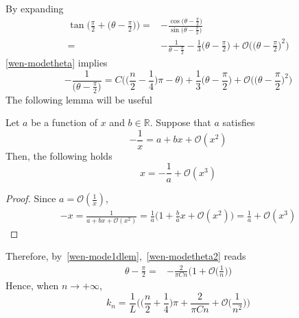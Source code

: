 By expanding
\begin{equation*}
\begin{split}
\tan\Big(\frac{\pi}{2} + \big(\theta - \frac \pi 2 \big) \Big) = &
- \frac{\cos\big(\theta-\frac{\pi}{2}\big)}{\sin\big(\theta-\frac{\pi}{2}\big)} \\
= & 
-\frac{1}{\theta - \frac \pi 2 } - \frac{1}{3}\big(\theta - \frac{\pi}{2}\big) + \mathcal{O}\Big(\big(\theta - \frac \pi 2 \big)^2\Big)
\end{split}
\end{equation*}
\cref{wen-modetheta} implies
\begin{equation}\label{wen-modetheta2}
-\frac{1}{\big(\theta - \frac \pi 2\big)} = 
C\Big( \big(\frac n 2 -\frac 1 4 \big)\pi - \theta \Big) +  \frac{1}{3}\big(\theta - \frac{\pi}{2}\big) + \mathcal{O}\Big(\big(\theta - \frac \pi 2 \big)^2\Big)
\end{equation}
The following lemma will be useful
\begin{lemma}\label{wen-mode1dlem}
Let $a$ be a function of $x$ and $b \in\mathbb{R}$.
Suppose that $a $ satisfies
\begin{equation*}
-\frac 1 x = a + bx + \mathcal{O}(x^2)
\end{equation*}
Then, the following holds
\begin{equation*}
x = -\frac 1 a + \mathcal{O}(x^3)
\end{equation*}
\end{lemma}
\begin{proof}
Since $a = \mathcal{O}(\frac 1 x) $, 
\begin{equation*}
\begin{split}
-x =  \frac{1}{a + bx + \mathcal{O}(x^2)} 
= \frac 1 a \big(1 + \frac b a x + \mathcal{O}(x^2)\big) 
=  \frac 1 a +  \mathcal{O}(x^3)
\end{split}
\end{equation*}
\end{proof}
Therefore, by~\cref{wen-mode1dlem},~\cref{wen-modetheta2} reads
\begin{equation*}
\begin{split}
\theta - \frac{\pi}{ 2} = &  -\frac{2}{\pi C n}\Big( 1 + \mathcal{O}\big( \frac 1 n\big) \Big)
\end{split}
\end{equation*}
Hence, when $n\rightarrow +\infty$, 
\begin{equation*}
k_n = \frac 1 L \Big( \big( \frac n 2 + \frac 1 4 \big)\pi + \frac{2}{\pi C n}+ \mathcal{O}\big(\frac{1}{n^2}\big) \Big)
\end{equation*}

